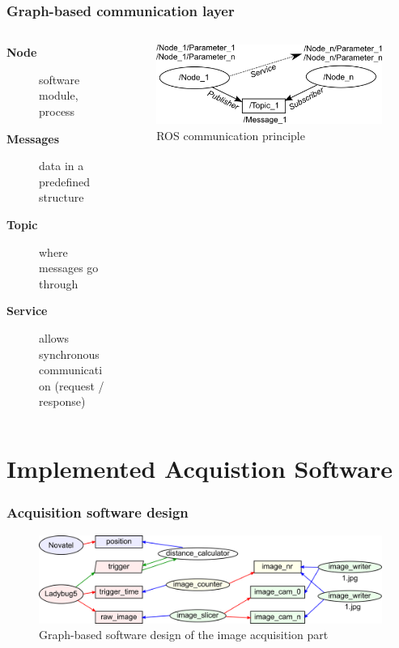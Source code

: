 \documentclass[aspectratio=169]{beamer}
\begin{document}
  \begin{frame}
   \frametitle{Graph-based communication layer}
   \begin{columns}[onlytextwidth]
    \begin{column}{0.5\textwidth}
    
      \begin{description}
       \item [\textbf{Node}] software module, process
       \item [\textbf{Messages}] data in a predefined structure
       \item [\textbf{Topic}] where messages go through
       \item [\textbf{Service}] allows synchronous communication (request / response)
      \end{description}
       
    \end{column}
    \begin{column}{0.5\textwidth}

      \begin{figure}[h]
	\centering
	\includegraphics[width=\textwidth]{./Abbildungen/ROS-Graph-basic.png}
	\caption{ROS communication principle}
	\label{abb:graph}
      \end{figure}
    \end{column}
   \end{columns}
  \end{frame}

\section{Implemented Acquistion Software}

  \begin{frame}
   \frametitle{Acquisition software design}
    
    \begin{figure}[h]
      \centering
      \includegraphics[width=13.5cm]{./Abbildungen/ROSImageCapturing.png}
      \caption{Graph-based software design of the image acquisition part}
      \label{abb:ROSImageCapturing}
    \end{figure}

  \end{frame}
\end{document}
